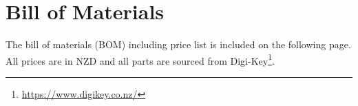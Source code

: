 \section{Bill of Materials}
\label{ap:bom}

The bill of materials (BOM) including price list is included on the following page.
All prices are in NZD and all parts are sourced from Digi-Key\footnote{\url{https://www.digikey.co.nz/}}.



